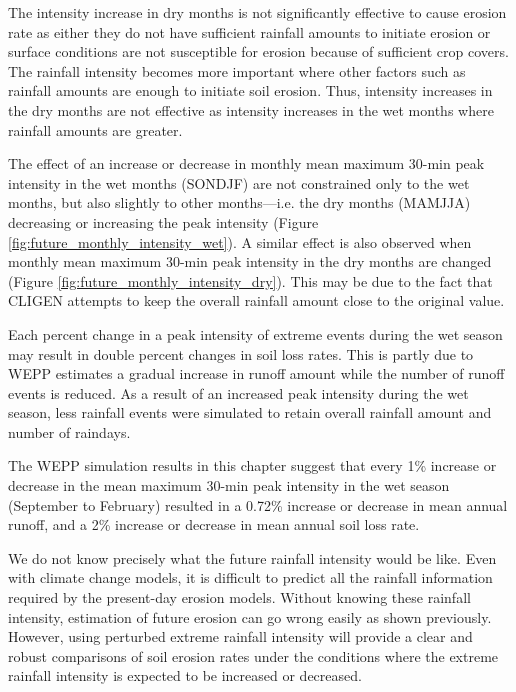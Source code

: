 The intensity increase in dry months is not significantly effective to cause
erosion rate as either they do not have sufficient rainfall amounts to initiate
erosion or surface conditions are not susceptible for erosion because of
sufficient crop covers. The rainfall intensity becomes more important where
other factors such as rainfall amounts are enough to initiate soil erosion.
Thus, intensity increases in the dry months are not effective as intensity
increases in the wet months where rainfall amounts are greater.

The effect of an increase or decrease in monthly mean maximum 30-min peak
intensity in the wet months (SONDJF) are not constrained only to the wet months,
but also slightly to other months---i.e. the dry months (MAMJJA) decreasing or
increasing the peak intensity (Figure \ref{fig:future_monthly_intensity_wet}). A
similar effect is also observed when monthly mean maximum 30-min peak intensity
in the dry months are changed (Figure \ref{fig:future_monthly_intensity_dry}).
This may be due to the fact that CLIGEN attempts to keep the overall rainfall
amount close to the original value.

Each percent change in a peak intensity of extreme events during the wet season
may result in double percent changes in soil loss rates. This is partly due to
WEPP estimates a gradual increase in runoff amount while the number of runoff
events is reduced. As a result of an increased peak intensity during the wet
season, less rainfall events were simulated to retain overall rainfall amount
and number of raindays.

The WEPP simulation results in this chapter suggest that every 1\% increase or
decrease in the mean maximum 30-min peak intensity in the wet season (September
to February) resulted in a 0.72\% increase or decrease in mean annual runoff,
and a 2\% increase or decrease in mean annual soil loss rate.

We do not know precisely what the future rainfall intensity would be like. Even
with climate change models, it is difficult to predict all the rainfall
information required by the present-day erosion models. Without knowing these
rainfall intensity, estimation of future erosion can go wrong easily as shown
previously.
However, using perturbed extreme rainfall intensity will provide a clear and
robust comparisons of soil erosion rates under the conditions where the extreme
rainfall intensity is expected to be increased or decreased.



